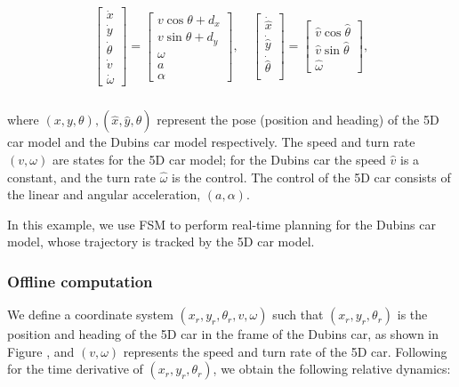 \begin{equation}
\label{eq:5D_and_3D_dyn}
\begin{aligned}
\begin{array}{c}
\left[
\begin{array}{c}
\dot x\\
\dot y\\
\dot\theta\\
\dot v\\
\dot \omega
\end{array}
\right]
=
\left[
\begin{array}{c}
v \cos \theta + d_x\\
v \sin \theta + d_y\\
\omega \\
a\\
\alpha
\end{array}
\right], \quad
\left[
\begin{array}{c}
\dot {\hat x}\\
\dot {\hat y}\\
\dot {\hat \theta}\\
\end{array}
\right] 
=
\left[
\begin{array}{c}
\hat v \cos \hat\theta\\
\hat v \sin \hat\theta\\
\hat \omega
\end{array}
\right],
\end{array}\\
\end{aligned}
\end{equation}

\noindent where $(x,y,\theta),(\hat x, \hat y, \hat\theta)$ represent the pose (position and heading) of the 5D car model and the Dubins car model respectively. The speed and turn rate $(v, \omega)$ are states for the 5D car model; for the Dubins car the speed $\hat v$ is a constant, and the turn rate $\hat \omega$ is the control. The control of the 5D car consists of the linear and angular acceleration, $(a, \alpha)$.

In this example, we use FSM \cite{} to perform real-time planning for the Dubins car model, whose trajectory is tracked by the 5D car model.

\subsubsection{Offline computation}

We define a coordinate system $(x_r, y_r, \theta_r, v, \omega)$ such that $(x_r, y_r, \theta_r)$ is the position and heading of the 5D car in the frame of the Dubins car, as shown in Figure \cite{}, and $(v, \omega)$ represents the speed and turn rate of the 5D car. Following \cite{Mitchell05} for the time derivative of $(x_r, y_r, \theta_r)$, we obtain the following relative dynamics:

